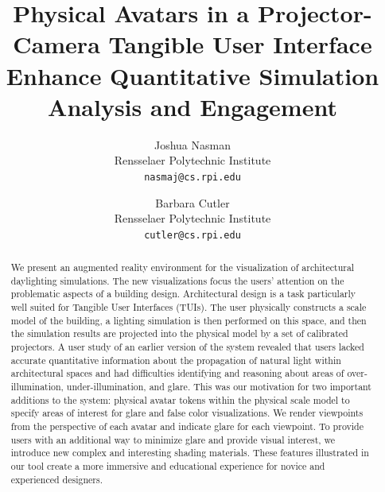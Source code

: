 \documentclass[10pt,twocolumn,letterpaper]{article}
\begin{document}

\title {Physical Avatars in a Projector-Camera Tangible User Interface 
\\  Enhance Quantitative Simulation Analysis and Engagement}

\author{Joshua Nasman\\
Rensselaer Polytechnic Institute\\
{\tt\small nasmaj@cs.rpi.edu}\\
\and
Barbara Cutler\\
Rensselaer Polytechnic Institute\\
{\tt\small cutler@cs.rpi.edu}\\
}


\maketitle

\begin{abstract}
\vspace{-0.1in}
%
We present an augmented reality environment for the visualization of
architectural daylighting simulations.  The new visualizations focus
the users' attention on the problematic aspects of a building design.
Architectural design is a task particularly well suited for Tangible
User Interfaces (TUIs).  
The user physically constructs a scale model of the building, a
lighting simulation is then performed on this space, and then the
simulation results are projected into the physical model by a set of
calibrated projectors.
A user study of an earlier version of the system revealed that users
lacked accurate quantitative information about the propagation of
natural light within architectural spaces and had difficulties
identifying and reasoning about areas of over-illumination,
under-illumination, and glare.  This was our motivation for two
important additions to the system: physical avatar tokens within the
physical scale model to specify areas of interest for glare and false
color visualizations.  We render viewpoints from the perspective of
each avatar and indicate glare for each viewpoint.  To provide users
with an additional way to minimize glare and provide visual interest,
we introduce new complex and interesting shading materials.
These features illustrated in our tool create a more immersive and
educational experience for novice and experienced designers.
\vspace{-0.15in}
\end{abstract}
\end{document}
